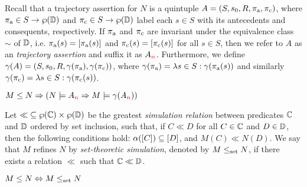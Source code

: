 
Recall that a trajectory assertion for $N$ is a quintuple $A = (S, s_{0}, R, \operatorname{\pi_{\textrm{a}}}, \operatorname{\pi_{\textrm{c}}})$, where $\operatorname{\pi_{\textrm{a}}} \in S \rightarrow \wp(\mathbb{D})$ and $\operatorname{\pi_{\textrm{c}}} \in S \rightarrow \wp(\mathbb{D})$ label each $s \in S$ with its antecedents and consequents, respectively. If $\operatorname{\pi_{\textrm{a}}}$ and $\operatorname{\pi_{\textrm{c}}}$ are invariant under the equivalence class $\sim$ of $\mathbb{D}$, i.e. $\operatorname{\pi_{\textrm{a}}}(s) = [\operatorname{\pi_{\textrm{a}}}(s)]$ and $\operatorname{\pi_{\textrm{c}}}(s) = [\operatorname{\pi_{\textrm{c}}}(s)]$ for all $s \in S$, then we refer to $A$ as an \textit{ trajectory assertion} and suffix it as $A_{\textcolor{red}{n}}$. Furthermore, we define $\gamma(A) = (S, s_{0}, R, \gamma(\operatorname{\pi_{\textrm{a}}}), \gamma(\operatorname{\pi_{\textrm{c}}}))$, where $\gamma(\operatorname{\pi_{\textrm{a}}}) = \lambda s \in S : \gamma(\operatorname{\pi_{\textrm{a}}}(s))$ and similarly $\gamma(\operatorname{\pi_{\textrm{c}}}) = \lambda s \in S : \gamma(\operatorname{\pi_{\textrm{c}}}(s))$.
%
\begin{theorem} \label{thm:traj-refines}
$M \leq N \Rightarrow (N \models A_{\textcolor{red}{n}} \Rightarrow M \models \gamma(A_{\textcolor{red}{n}}))$
\end{theorem}

Let ${\ll} \subseteq \wp(\mathbb{C}) \times \wp(\mathbb{D})$ be the greatest \textit{simulation relation} between predicates $\mathbb{C}$ and $\mathbb{D}$ ordered by set inclusion, such that, if $C \ll D$ for all $C \in \mathbb{C}$ and $D \in \mathbb{D}$, then the following conditions hold: $\alpha([C]) \subseteq [D]$, and $M(C) \ll N(D)$. We say that $M$ refines $N$ by \textit{set-theoretic simulation}, denoted by $M \leq_{\textrm{set}} N$, if there exists a relation $\ll$ such that $\mathbb{C} \ll \mathbb{D}$.
%
\begin{theorem} \label{thm:traj-equal-set}
$M \leq N \Leftrightarrow M \leq_{\textrm{set}} N$
\end{theorem}


